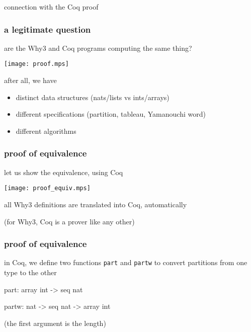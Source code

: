 \documentclass{beamer}
\let\emph\alert
\begin{document}
\begin{frame}
  \begin{center}
    \emph{connection with the Coq proof} \\
    \hrulefill
  \end{center}
\end{frame}

\begin{frame}\frametitle{a legitimate question}
  are the Why3 and Coq programs computing the same thing?

  \begin{center}
    \texttt{[image: proof.mps]}
  \end{center}

  after all, we have
  \begin{itemize}
  \item distinct data structures (nats/lists vs ints/arrays)
  \item different specifications (partition, tableau, Yamanouchi word)
  \item different algorithms
  \end{itemize}
\end{frame}

\begin{frame}\frametitle{proof of equivalence}

  let us show the equivalence, using Coq

  \begin{center}
    \texttt{[image: proof\_equiv.mps]}
  \end{center}

  all Why3 definitions are translated into Coq, automatically

  (for Why3, Coq is a prover like any other)
\end{frame}

\begin{frame}[fragile]\frametitle{proof of equivalence}

  in Coq, we define two functions \texttt{part} and \texttt{partw} to
  convert partitions from one type to the other

\bigskip
\begin{coq}
  part: array int -> seq nat
\end{coq}
\begin{coq}
  partw: nat -> seq nat -> array int
\end{coq}
\quad(the first argument is the length)
\end{frame}
\end{document}
